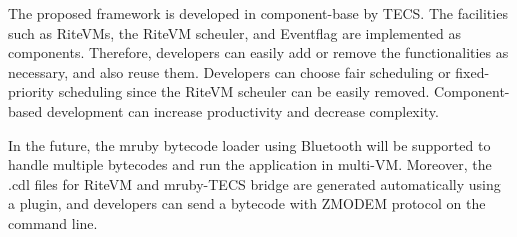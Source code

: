 \documentclass[conference,compsoc]{IEEEtran}
\begin{document}
The proposed framework is developed in component-base by TECS.
The facilities such as RiteVMs, the RiteVM scheuler, and Eventflag are implemented as components.
Therefore, developers can easily add or remove the functionalities as necessary, and also reuse them.
Developers can choose fair scheduling or fixed-priority scheduling since the RiteVM scheuler can be easily removed.
Component-based development can increase productivity and decrease complexity.

In the future, the mruby bytecode loader using Bluetooth will be supported to handle multiple bytecodes and run the application in multi-VM.
Moreover, the .cdl files for RiteVM and mruby-TECS bridge are generated automatically using a plugin, and developers can send a bytecode with ZMODEM protocol on the command line.



\end{document}
